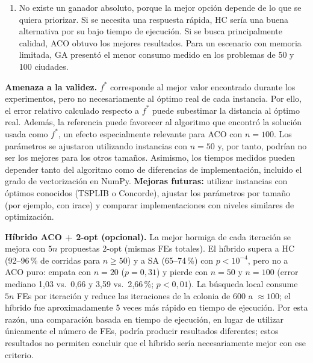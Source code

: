 \documentclass[10pt,a4paper]{article}
\begin{document}
\begin{enumerate}[leftmargin=1.2em]
\item No existe un ganador absoluto, porque la mejor opción depende de lo que se quiera priorizar. Si se necesita una respuesta rápida, HC sería una buena alternativa por su bajo tiempo de ejecución. Si se busca principalmente calidad, ACO obtuvo los mejores resultados. Para un escenario con memoria limitada, GA presentó el menor consumo medido en los problemas de 50 y 100 ciudades.
\end{enumerate}

\textbf{Amenaza a la validez.} $f^\ast$ corresponde al mejor valor encontrado durante los experimentos, pero no necesariamente al óptimo real de cada instancia. Por ello, el error relativo calculado respecto a $f^\ast$ puede subestimar la distancia al óptimo real. Además, la referencia puede favorecer al algoritmo que encontró la solución usada como $f^\ast$, un efecto especialmente relevante para ACO con $n=100$.
Los parámetros se ajustaron utilizando instancias con $n=50$ y, por tanto, podrían no ser los mejores para los otros tamaños. Asimismo, los tiempos medidos pueden depender tanto del algoritmo como de diferencias de implementación, incluido el grado de vectorización en NumPy.
\textbf{Mejoras futuras:} utilizar instancias con óptimos conocidos (TSPLIB o Concorde), ajustar los parámetros por tamaño (por ejemplo, con irace) y comparar implementaciones con niveles similares de optimización.

\textbf{Híbrido ACO + 2-opt (opcional).} La mejor hormiga de cada iteración se mejora con $5n$ propuestas 2-opt (mismas FEs totales). El híbrido supera a HC (92--96\,\% de corridas para $n\ge50$) y a SA (65--74\,\%) con $p<10^{-4}$,
pero no a ACO puro: empata con $n=20$ ($p=0{,}31$) y pierde con $n=50$ y $n=100$ (error mediano 1{,}03 vs.\ 0{,}66 y 3{,}59 vs.\ 2{,}66\,\%; $p<0{,}01$). La búsqueda local consume $5n$ FEs por iteración y reduce las iteraciones de la colonia de 600 a $\approx100$;
el híbrido fue aproximadamente 5 veces más rápido en tiempo de ejecución. Por esta razón, una comparación basada en tiempo de ejecución, en lugar de utilizar únicamente el número de FEs, podría producir resultados diferentes; estos resultados no permiten concluir que el híbrido sería necesariamente mejor con ese criterio.
\end{document}
